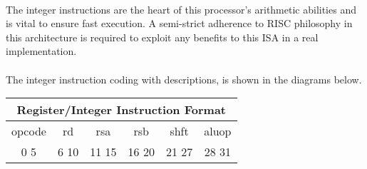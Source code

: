 \documentclass[letterpaper, 11pt]{article}
\begin{document}
\paragraph{}The integer instructions are the heart of this processor's arithmetic abilities and is vital to ensure fast execution. A semi-strict
adherence to RISC philosophy in this architecture is required to exploit any benefits to this ISA in a real implementation.
\paragraph{}The integer instruction coding with descriptions, is shown in the diagrams below.

\begin{center}
		\begin{tabular}{|c|c|c|c|c|c|}
			\multicolumn{6}{c}{Register/Integer Instruction Format}\\ \hline
			\hspace{2pt} opcode \hspace{2pt} & \hspace{5pt} rd \hspace{5pt} &  \hspace{4pt} rsa \hspace{4pt} & \hspace{4pt}rsb  \hspace{4pt}& \hspace{10pt}shft  \hspace{10pt} & \hspace{3pt} aluop \hspace{3pt}   \\	\hline
			0 \hfill 5& 6 \hfill 10 &11 \hfill  15& 16 \hfill  20&21 \hfill   27&28 \hfill   31\\ \hline

			
		
	\end{tabular}
\end{center}	
\end{document}
